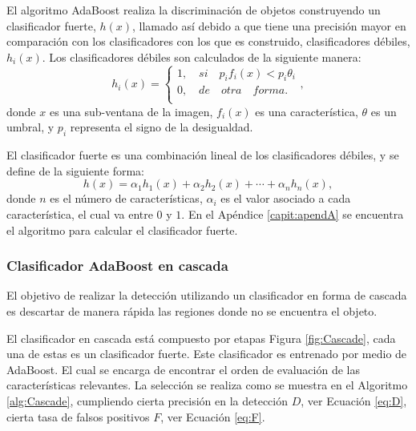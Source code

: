 El algoritmo AdaBoost realiza la discriminación de objetos construyendo un clasificador fuerte, $h(x)$, llamado así debido a que tiene una precisión mayor en comparación con los clasificadores con los que es construido, clasificadores débiles, $h_i(x)$. Los clasificadores débiles son calculados de la siguiente manera: 
\begin{equation}
h_i(x)=
\begin{cases}   
1, \quad si \quad  p_if_i(x)<p_i \theta_i \\
0, \quad de \quad otra \quad forma.\\
\end{cases} ,
\end{equation}
donde $x$ es una sub-ventana de la imagen, $f_i(x)$ es una característica, $\theta$ es un umbral, y $p_i$ representa el signo de la desigualdad.   

El clasificador fuerte es una combinación lineal de los clasificadores débiles, y se define de la siguiente forma: 
\begin{equation}
h(x)= \alpha_1h_1(x)+\alpha_2h_2(x)+ \cdots +\alpha_nh_n(x) ,
\end{equation}
donde $n$ es el n\'umero de características, $\alpha_i$ es el valor asociado a cada característica, el cual va entre $0$ y $1$. En el Apéndice \ref{capit:apendA} se encuentra el algoritmo para calcular el clasificador fuerte.

\subsubsection{Clasificador AdaBoost en cascada}\label{sssec:AdaboostCascade}   

El objetivo de realizar la detección utilizando un clasificador en forma de cascada es descartar de manera rápida las regiones donde no se encuentra el objeto.

El clasificador en cascada está compuesto por etapas Figura \ref{fig:Cascade}, cada una de estas es un clasificador fuerte. Este clasificador es entrenado por medio de AdaBoost. El cual se encarga de encontrar el orden de evaluación de las características relevantes. 
La selección se realiza como se muestra en el Algoritmo \ref{alg:Cascade}, cumpliendo cierta precisión en la detección $D$, ver Ecuación \ref{eq:D}, cierta tasa de falsos positivos $F$, ver Ecuación \ref{eq:F}.

